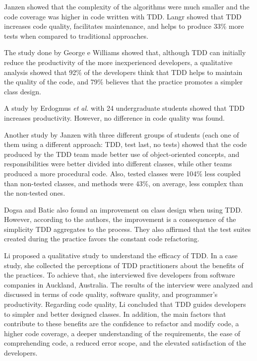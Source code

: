 \documentclass[conference]{IEEEtran}
\begin{document}
Janzen \cite{janzen-arch-improvement} showed that the complexity of the algorithms
were much smaller and the code coverage was higher in code written with TDD.
Langr \cite{langr} showed that TDD increases code quality, facilitates
maintenance, and helps to produce 33\% more tests when compared to traditional
approaches.

The study done by George e Williams \cite{george-e-williams} showed that,
although TDD can initially reduce the productivity of the more inexperienced
developers, a qualitative analysis showed that 92\% of the developers think
that TDD helps to maintain the quality of the code, and 79\% believes that
the practice promotes a simpler class design.

A study by Erdogmus \textit{et al.} \cite{erdogmus-morisio} with 24 undergraduate students
showed that TDD increases productivity. However, no difference in code quality
was found.

Another study by Janzen \cite{janzen-saiedian} with three different groups
of students (each one of them using a different approach: TDD, test last, no tests)
showed that the code produced by the TDD team made better use of object-oriented
concepts, and responsibilities were better divided into different classes,
while other teams produced a more procedural code. Also, tested classes were
104\% less coupled than non-tested classes, and methods were 43\%, on average, less complex
than the non-tested ones.

Dogsa and Batic \cite{dogsa-batic} also found an improvement on class design when
using TDD. However, according to the authors, the improvement is a consequence of the simplicity
TDD aggregates to the process. They also affirmed that the test suites created during
the practice favors the constant code refactoring.


Li \cite{angela-li} proposed a qualitative study to understand the efficacy of TDD.
In a case study, she collected the perceptions of TDD practitioners about the
benefits of the practices. To achieve that, she interviewed five developers
from software companies in Auckland, Australia. The results of the interview
were analyzed and discussed in terms of code quality, software quality, and
programmer's productivity. Regarding code quality, Li concluded that TDD
guides developers to simpler and better designed classes. In addition, the main
factors that contribute to these benefits are the confidence to refactor and
modify code, a higher code coverage, a deeper understanding of the requirements,
the ease of comprehending code, a reduced error scope, and the elevated
satisfaction of the developers.
\end{document}
